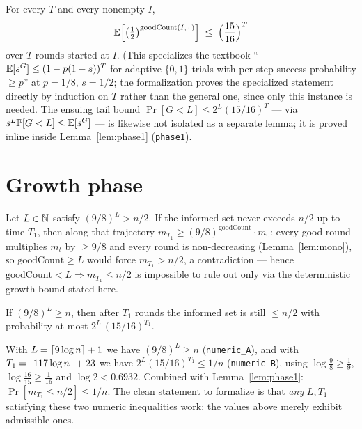 \begin{lemma}\label{lem:adaptive}
  \leanok
  For every $T$ and every nonempty $I$,
  \[
    \mathbb{E}\Bigl[\bigl(\tfrac12\bigr)^{\mathrm{goodCount}(I,\,\cdot\,)}\Bigr]
      \;\le\; \Bigl(\frac{15}{16}\Bigr)^{T}
  \]
  over $T$ rounds started at $I$. (This specializes the textbook
  ``$\mathbb{E}[s^G] \le (1-p(1-s))^T$ for adaptive $\{0,1\}$-trials with
  per-step success probability $\ge p$'' at $p = 1/8$, $s = 1/2$; the
  formalization proves the specialized statement directly by induction on
  $T$ rather than the general one, since only this instance is needed. The
  ensuing tail bound $\Pr[G < L] \le 2^{L}(15/16)^{T}$ — via
  $s^{L}\mathbb{P}[G<L] \le \mathbb{E}[s^G]$ — is likewise not isolated as a separate
  lemma; it is proved inline inside Lemma~\ref{lem:phase1}
  (\texttt{phase1}).
\end{lemma}

\section{Growth phase}\label{sec:growth}

\begin{lemma}\label{lem:force}
  \leanok
  Let $L \in \mathbb{N}$ satisfy $(9/8)^L > n/2$. If the informed set never exceeds
  $n/2$ up to time $T_1$, then along that trajectory
  $m_{T_1} \ge (9/8)^{\mathrm{goodCount}} \cdot m_0$: every good round
  multiplies $m_t$ by $\ge 9/8$ and every round is non-decreasing
  (Lemma~\ref{lem:mono}), so $\mathrm{goodCount} \ge L$ would force
  $m_{T_1} > n/2$, a contradiction — hence
  $\mathrm{goodCount} < L \Rightarrow m_{T_1} \le n/2$ is impossible to rule
  out only via the deterministic growth bound stated here.
\end{lemma}

\begin{lemma}[Phase 1]\label{lem:phase1}
  \leanok
  If $(9/8)^L \ge n$, then after $T_1$ rounds the informed set is still
  $\le n/2$ with probability at most $2^{L}\,(15/16)^{T_1}$.
\end{lemma}

\begin{lemma}\label{lem:constants}
  \leanok
  With $L = \left\lceil 9 \log n \right\rceil + 1$ we have $(9/8)^L \ge n$
  (\texttt{numeric\_A}), and with $T_1 = \left\lceil 117 \log n \right\rceil + 23$ we have
  $2^{L}(15/16)^{T_1} \le 1/n$ (\texttt{numeric\_B}), using
  $\log\tfrac98 \ge \tfrac19$, $\log\tfrac{16}{15} \ge \tfrac1{16}$ and
  $\log 2 < 0.6932$. Combined with Lemma~\ref{lem:phase1}:
  $\Pr[m_{T_1} \le n/2] \le 1/n$. The clean statement to formalize is that
  \emph{any} $L, T_1$ satisfying these two numeric inequalities work; the
  values above merely exhibit admissible ones.
\end{lemma}

